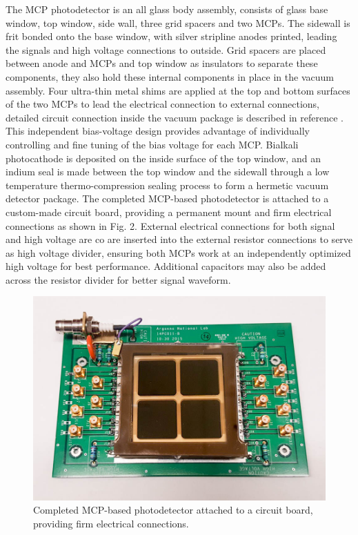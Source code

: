 \documentclass[preprint,5p]{elsarticle}
\begin{document}
The MCP photodetector is an all glass body assembly, consists of glass base 
window, top window, side wall, three grid spacers and two MCPs. The sidewall is 
frit bonded onto the base window, with silver stripline anodes printed, leading 
the signals and high voltage connections to outside. Grid spacers are placed 
between anode and MCPs and top window as insulators to separate these 
components, they also hold these internal components in place in the vacuum 
assembly. Four ultra-thin metal shims are applied at the top and bottom 
surfaces of the two MCPs to lead the electrical connection to external 
connections, detailed circuit connection inside the vacuum package is described 
in reference \cite{Xia-MCPs}. This independent bias-voltage design provides 
advantage of individually controlling and fine tuning of the bias voltage for 
each MCP. Bialkali photocathode is deposited on the inside surface of the top 
window, and an indium seal is made between the top window and the sidewall 
through a low temperature thermo-compression sealing process to form a hermetic 
vacuum detector package. The completed MCP-based photodetector is attached to a 
custom-made circuit board, providing a permanent mount and firm electrical 
connections as shown in Fig. 2. External electrical connections for both signal 
and high voltage are co are inserted into the external resistor connections to 
serve as high voltage divider, ensuring both MCPs work at an independently 
optimized high voltage for best performance. Additional capacitors may also be 
added across the resistor divider for better signal waveform.  

\begin{figure}[tbp]
\centering 
\includegraphics[scale=0.23]{fig/MCPs_assembly.png}
\caption{Completed MCP-based photodetector attached to a circuit board, 
providing firm electrical connections.} \label{fig:MCP_assm}
\end{figure}
\end{document}
